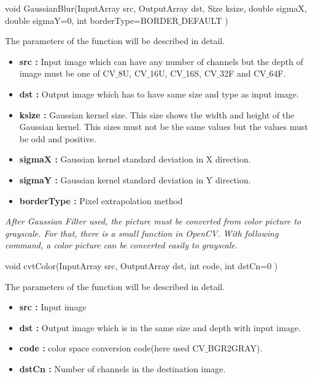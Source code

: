  \begin{center}
  
void GaussianBlur(InputArray src, OutputArray dst, Size ksize, double sigmaX, double sigmaY=0, int borderType=BORDER$\_$DEFAULT )

  \end{center}

The parameters of the function will be described in detail.\cite{GaussianBlur}
 
\begin{itemize}

\item \textbf{src : }Input image which can have any number of channels but the depth of image must be one of CV$\_$8U, CV$\_$16U, CV$\_$16S, CV$\_$32F and CV$\_$64F.
 
\item \textbf{dst : }Output image which has to have same size and type as input image.

\item \textbf{ksize : }Gaussian kernel size. This size shows the width and height of the Gaussian kernel. This sizes must not be the same values but the values must be odd and positive.

\item \textbf{sigmaX : }Gaussian kernel standard deviation in X direction.

\item \textbf{sigmaY : }Gaussian kernel standard deviation in Y direction.

\item \textbf{borderType : }Pixel extrapolation method

\end{itemize}

\emph{\color{blue}After Gaussian Filter used, the picture must be converted from color picture to grayscale. For that, there is a small function in OpenCV. With following command, a color picture can be converted easily to grayscale.}

 \begin{center}
 
void cvtColor(InputArray src, OutputArray dst, int code, int dstCn=0 )

 \end{center}
 
 The parameters of the function will be described in detail.
 
 \begin{itemize}

\item \textbf{src : }Input image
 
\item \textbf{dst : }Output image which is in the same size and depth with input image.

\item \textbf{code : }color space conversion code(here used CV$ \_ $BGR2GRAY).

\item \textbf{dstCn : }Number of channels in the destination image.


\end{itemize}

